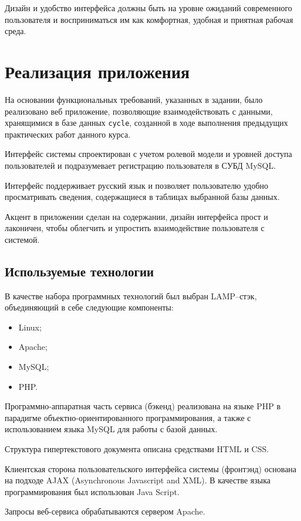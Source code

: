Дизайн и удобство интерфейса должны быть на уровне ожиданий
современного пользователя и восприниматься им как комфортная, удобная и
приятная рабочая среда.

\section{Реализация приложения}

На основании функциональных требований, указанных в задании, было реализовано веб приложение, позволяющие взаимодействовать с данными, хранящимися в базе данных \texttt{cycle}, созданной в ходе выполнения предыдущих практических работ данного курса.

Интерфейс системы спроектирован с учетом ролевой
модели и уровней доступа пользователей и подразумевает регистрацию пользователя в СУБД MySQL.

Интерфейс поддерживает русский язык и позволяет пользователю удобно просматривать сведения, содержащиеся в таблицах выбранной базы данных.

Акцент в приложении сделан на содержании, дизайн интерфейса прост и лаконичен, чтобы облегчить и упростить взаимодействие пользователя с системой.

\subsection{Используемые технологии}
В качестве набора программных технологий был выбран LAMP--стэк, объединяющий в себе следующие компоненты:
\begin{itemize}
	\item Linux;
	\item Apache;
	\item MySQL;
	\item PHP.
\end{itemize}

Программно-аппаратная часть сервиса (бэкенд) реализована на языке PHP в парадигме объектно-ориентированного программирования, а также с использованием языка MySQL для работы с базой данных.

Структура гипертекстового документа описана средствами HTML и CSS.

Клиентская сторона пользовательского интерфейса системы (фронтэнд) основана на подходе AJAX (Asynchronous Javascript and XML). В качестве языка программирования был использован Java Script. 

Запросы веб-сервиса обрабатываются сервером Apache. 

